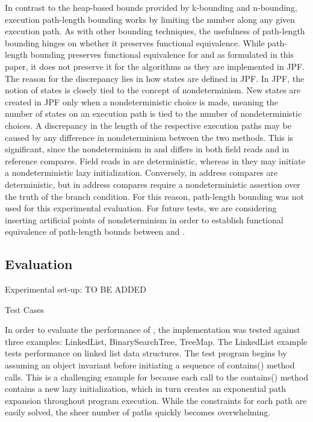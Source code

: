 In contrast to the heap-based bounds provided by k-bounding and n-bounding, execution path-length bounding works by limiting the number along any given execution path. As with other bounding techniques, the usefulness of path-length bounding hinges on whether it preserves functional equivalence. While path-length bounding preserves functional equivalence for \gsetxt{} and \symtxt{} as formulated in this paper, it does not preserve it for the algorithms as they are implemented in JPF. The reason for the discrepancy lies in how states are defined in JPF. In JPF, the notion of states is closely tied to the concept of nondeterminism. New states are created in JPF only when a nondeterministic choice is made, meaning the number of states on an execution path is tied to the number of nondeterministic choices. A discrepancy in the length of the respective execution paths may be caused by any difference in nondeterminism between the two methods. This is significant, since the nondeterminism in \symtxt{} and \gsetxt{} differs in both field reads and in reference compares. Field reads in \symtxt{} are deterministic, whereas in \gsetxt{} they may initiate a nondeterministic lazy initialization. Conversely, in \gsetxt{} address compares are deterministic, but in \symtxt{} address compares require a nondeterministic assertion over the truth of the branch condition. For this reason, path-length bounding was not used for this experimental evaluation. For future tests, we are considering inserting artificial points of nondeterminism in order to establish functional equivalence of path-length bounds between \gsetxt{} and \symtxt{}. 

\subsection{Evaluation} 
Experimental set-up: TO BE ADDED

Test Cases

In order to evaluate the performance of \symtxt{}, the implementation was tested against three examples: LinkedList, BinarySearchTree, TreeMap.
The LinkedList example tests performance on linked list data structures. The test program begins by assuming an object invariant before initiating a sequence of contains() method calls. This is a challenging example for \gsetxt{} because each call to the contains() method contains a new lazy initialization, which in turn creates an exponential path expansion throughout program execution. While the constraints for each path are easily solved, the sheer number of paths quickly becomes overwhelming.

